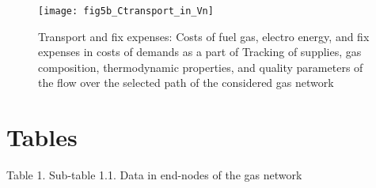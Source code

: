 \documentclass{article}
\begin{document}
\bigskip

\begin{figure}[tbp]
\hspace{10cm} \centering\texttt{[image: fig5b\_Ctransport\_in\_Vn]}\newline
\caption{Transport and fix expenses: Costs of fuel gas, electro energy, and
fix expenses in costs of demands as a part of Tracking of supplies, gas
composition, thermodynamic properties, and quality parameters of the flow
over the selected path of the considered gas network}
\label{fig:5b}
\end{figure}

\bigskip


\bigskip

\newpage

\bigskip

\section{Tables}

\bigskip

Table 1. Sub-table 1.1. Data in end-nodes of the gas network

\bigskip
\end{document}
